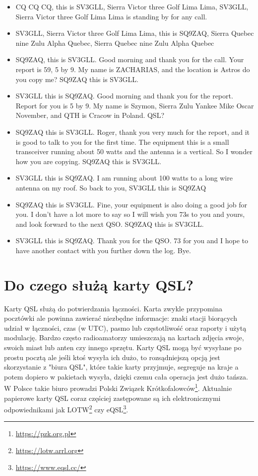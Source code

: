 \documentclass[a4paper,12pt]{article}
\begin{document}
\begin{itemize}
 \item CQ CQ CQ, this is SV3GLL, Sierra Victor three Golf Lima Lima, SV3GLL, Sierra Victor three Golf Lima Lima is standing by for any call.
 \item SV3GLL, Sierra Victor three Golf Lima Lima, this is SQ9ZAQ, Sierra Quebec nine Zulu Alpha Quebec, Sierra Quebec nine Zulu Alpha Quebec
 \item SQ9ZAQ, this is SV3GLL. Good morning and thank you for the call. Your report is 59, 5 by 9. My name is ZACHARIAS, and the location is Astros do you copy me? SQ9ZAQ this is SV3GLL.
 \item SV3GLL this is SQ9ZAQ. Good morning and thank you for the report. Report for you is 5 by 9. My name is Szymon, Sierra Zulu Yankee Mike Oscar November, and QTH is Cracow in Poland. QSL?
 \item SQ9ZAQ this is SV3GLL. Roger, thank you very much for the report, and it is good to talk to you for the first time. The equipment this is a small transceiver running about 50 watts and the antenna is a vertical. So I wonder how you are copying. SQ9ZAQ this is SV3GLL.
 \item SV3GLL this is SQ9ZAQ. I am running about 100 watts to a long wire antenna on my roof. So back to you, SV3GLL this is SQ9ZAQ
 \item SQ9ZAQ this is SV3GLL. Fine, your equipment is also doing a good job for you. I don't have a lot more to say so I will wish you 73s to you and yours, and look forward to the next QSO. SQ9ZAQ this is SV3GLL.
 \item SV3GLL this is SQ9ZAQ. Thank you for the QSO. 73 for you and I hope to have another contact with you further down the log. Bye.
\end{itemize}

\section{Do czego służą karty QSL?}
Karty QSL służą do potwierdzania łączności. Karta zwykle przypomina pocztówki ale powinna zawierać niezbędne informacje: znaki stacji biorących udział w łączności, czas (w UTC), pasmo lub częstotliwość oraz raporty i użytą modulację. Bardzo często radioamatorzy umieszczają na kartach zdjęcia swoje, swoich miast lub anten czy innego sprzętu. Karty QSL mogą być wysyłane po prostu pocztą ale jeśli ktoś wysyła ich dużo, to rozsądniejszą opcją jest skorzystanie z "biura QSL", które takie karty przyjmuje, segreguje na kraje a potem dopiero w pakietach wysyła, dzięki czemu cała operacja jest dużo tańsza. W Polsce takie biuro prowadzi Polski Związek Krótkofalowców\footnote{\url{https://pzk.org.pl}}. Aktualnie papierowe karty QSL coraz częściej zastępowane są ich elektronicznymi odpowiednikami jak LOTW\footnote{\url{https://lotw.arrl.org}} czy eQSL\footnote{\url{https://www.eqsl.cc/}}. 
\end{document}
